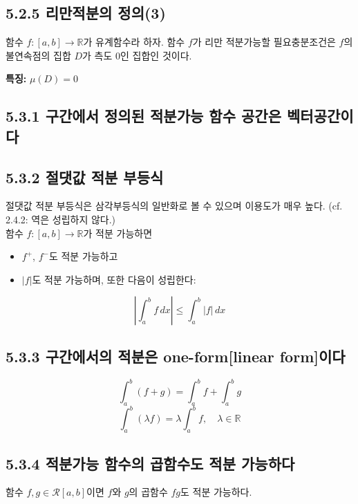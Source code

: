 \documentclass{article}
\begin{document}
\subsection*{5.2.5 리만적분의 정의(3)}

함수 \( f: [a, b] \to \mathbb{R} \)가 유계함수라 하자. 함수 \( f \)가 리만 적분가능할 필요충분조건은 \( f \)의 불연속점의 집합 \( D \)가 측도 0인 집합인 것이다.

\textbf{특징:} \( \mu(D) = 0 \)

\subsection*{5.3.1 구간에서 정의된 적분가능 함수 공간은 벡터공간이다}

\subsection*{5.3.2 절댓값 적분 부등식}

절댓값 적분 부등식은 삼각부등식의 일반화로 볼 수 있으며 이용도가 매우 높다. (cf. 2.4.2: 역은 성립하지 않다.)\\  
함수 \( f: [a, b] \to \mathbb{R} \)가 적분 가능하면
\begin{itemize}
    \item \( f^+ \), \( f^- \)도 적분 가능하고
    \item \( |f| \)도 적분 가능하며, 또한 다음이 성립한다:
\end{itemize}
\[
\left| \int_a^b f \, dx \right| \leq \int_a^b |f| \, dx
\]

\subsection*{5.3.3 구간에서의 적분은 one-form[linear form]이다}

\[
\int_a^b (f + g) = \int_a^b f + \int_a^b g
\]
\[
\int_a^b (\lambda f) = \lambda \int_a^b f, \quad \lambda \in \mathbb{R}
\]

\subsection*{5.3.4 적분가능 함수의 곱함수도 적분 가능하다}

함수 \( f, g \in \mathcal{R}[a, b] \)이면 \( f \)와 \( g \)의 곱함수 \( fg \)도 적분 가능하다.


\setcounter{subsection}{3}
\subsection{\fontsize{11.5}{13}\selectfont{리만적분과 도함수 사이의 관계를 설명하여 주는 미적분학의 기본정리}}
\end{document}
